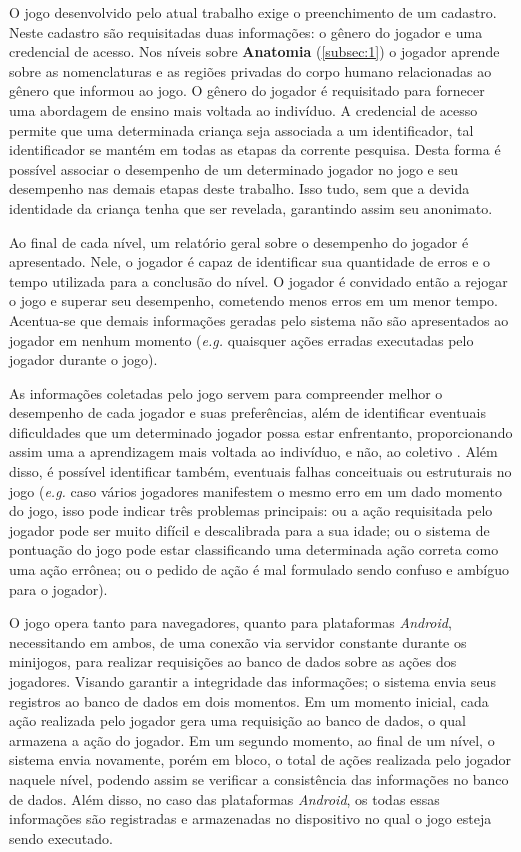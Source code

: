 O jogo desenvolvido pelo atual trabalho exige o preenchimento de um cadastro. Neste cadastro são requisitadas duas informações: o gênero do jogador e uma credencial de acesso. Nos níveis sobre \textbf{Anatomia} (\autoref{subsec:1}) o jogador aprende sobre as nomenclaturas e as regiões privadas do corpo humano relacionadas ao gênero que informou ao jogo. O gênero do jogador é requisitado para fornecer uma abordagem de ensino mais voltada ao indivíduo. A credencial de acesso permite que uma determinada criança seja associada a um identificador, tal identificador se mantém em todas as etapas da corrente pesquisa. Desta forma é possível associar o desempenho de um determinado jogador no jogo e seu desempenho nas demais etapas deste trabalho. Isso tudo, sem que a devida identidade da criança tenha que ser revelada, garantindo assim seu anonimato. 

Ao final de cada nível, um relatório geral sobre o desempenho do jogador é apresentado. Nele, o jogador é capaz de identificar sua quantidade de erros e o tempo utilizada para a conclusão do nível. O jogador é convidado então a rejogar o jogo e superar seu desempenho, cometendo menos erros em um menor tempo. Acentua-se que demais informações geradas pelo sistema não são apresentados ao jogador em nenhum momento (\textit{e.g.} quaisquer ações erradas executadas pelo jogador durante o jogo). 

As informações coletadas pelo jogo servem para compreender melhor o desempenho de cada jogador e suas preferências, além de identificar eventuais dificuldades que um determinado jogador possa estar enfrentanto, proporcionando assim uma a aprendizagem mais voltada ao indivíduo, e não, ao coletivo \cite{carrara2018criancca}. Além disso, é possível identificar também, eventuais falhas conceituais ou estruturais no jogo (\textit{e.g.} caso vários jogadores manifestem o mesmo erro em um dado momento do jogo, isso pode indicar três problemas principais: ou a ação requisitada pelo jogador pode ser muito difícil e descalibrada para a sua idade; ou o sistema de pontuação do jogo pode estar classificando uma determinada ação correta como uma ação errônea; ou o pedido de ação é mal formulado sendo confuso e ambíguo para o jogador).

O jogo opera tanto para navegadores, quanto para plataformas \textit{Android}, necessitando em ambos, de uma conexão via servidor constante durante os minijogos, para realizar requisições ao banco de dados sobre as ações dos jogadores. Visando garantir a integridade das informações; o sistema envia seus registros ao banco de dados em dois momentos. Em um momento inicial, cada ação realizada pelo jogador gera uma requisição ao banco de dados, o qual armazena a ação do jogador. Em um segundo momento, ao final de um nível, o sistema envia novamente, porém em bloco, o total de ações realizada pelo jogador naquele nível, podendo assim se verificar a consistência das informações no banco de dados. Além disso, no caso das plataformas \textit{Android}, os todas essas informações são registradas e armazenadas no dispositivo no qual o jogo esteja sendo executado.

